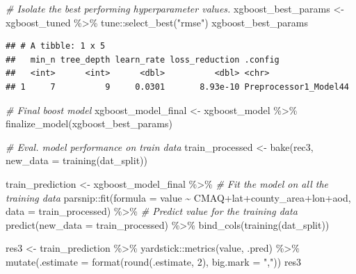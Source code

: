 \documentclass[
]{article}
\newenvironment{Shaded}{\begin{snugshade}}{\end{snugshade}}
\newcommand{\AttributeTok}[1]{\textcolor[rgb]{0.77,0.63,0.00}{#1}}
\newcommand{\CommentTok}[1]{\textcolor[rgb]{0.56,0.35,0.01}{\textit{#1}}}
\newcommand{\DecValTok}[1]{\textcolor[rgb]{0.00,0.00,0.81}{#1}}
\newcommand{\FunctionTok}[1]{\textcolor[rgb]{0.00,0.00,0.00}{#1}}
\newcommand{\NormalTok}[1]{#1}
\newcommand{\OtherTok}[1]{\textcolor[rgb]{0.56,0.35,0.01}{#1}}
\newcommand{\SpecialCharTok}[1]{\textcolor[rgb]{0.00,0.00,0.00}{#1}}
\newcommand{\StringTok}[1]{\textcolor[rgb]{0.31,0.60,0.02}{#1}}
\begin{document}
\begin{Shaded}
\begin{Highlighting}[]
\CommentTok{\# Isolate the best performing hyperparameter values.}
\NormalTok{xgboost\_best\_params }\OtherTok{\textless{}{-}}\NormalTok{ xgboost\_tuned }\SpecialCharTok{\%\textgreater{}\%}\NormalTok{ tune}\SpecialCharTok{::}\FunctionTok{select\_best}\NormalTok{(}\StringTok{"rmse"}\NormalTok{)}
\NormalTok{xgboost\_best\_params}
\end{Highlighting}
\end{Shaded}

\begin{verbatim}
## # A tibble: 1 x 5
##   min_n tree_depth learn_rate loss_reduction .config              
##   <int>      <int>      <dbl>          <dbl> <chr>                
## 1     7          9     0.0301       8.93e-10 Preprocessor1_Model44
\end{verbatim}

\begin{Shaded}
\begin{Highlighting}[]
\CommentTok{\# Final boost model}
\NormalTok{xgboost\_model\_final }\OtherTok{\textless{}{-}}\NormalTok{ xgboost\_model }\SpecialCharTok{\%\textgreater{}\%} \FunctionTok{finalize\_model}\NormalTok{(xgboost\_best\_params)}

\CommentTok{\# Eval. model performance on train data}
\NormalTok{train\_processed }\OtherTok{\textless{}{-}} \FunctionTok{bake}\NormalTok{(rec3,  }\AttributeTok{new\_data =} \FunctionTok{training}\NormalTok{(dat\_split))}

\NormalTok{train\_prediction }\OtherTok{\textless{}{-}}\NormalTok{ xgboost\_model\_final }\SpecialCharTok{\%\textgreater{}\%}
  \CommentTok{\# Fit the model on all the training data}
\NormalTok{  parsnip}\SpecialCharTok{::}\FunctionTok{fit}\NormalTok{(}\AttributeTok{formula =}\NormalTok{ value }\SpecialCharTok{\textasciitilde{}}\NormalTok{ CMAQ}\SpecialCharTok{+}\NormalTok{lat}\SpecialCharTok{+}\NormalTok{county\_area}\SpecialCharTok{+}\NormalTok{lon}\SpecialCharTok{+}\NormalTok{aod, }\AttributeTok{data =}\NormalTok{ train\_processed) }\SpecialCharTok{\%\textgreater{}\%}
  \CommentTok{\# Predict value for the training data}
  \FunctionTok{predict}\NormalTok{(}\AttributeTok{new\_data =}\NormalTok{ train\_processed) }\SpecialCharTok{\%\textgreater{}\%}
  \FunctionTok{bind\_cols}\NormalTok{(}\FunctionTok{training}\NormalTok{(dat\_split))}

\NormalTok{res3 }\OtherTok{\textless{}{-}}\NormalTok{ train\_prediction }\SpecialCharTok{\%\textgreater{}\%}
\NormalTok{  yardstick}\SpecialCharTok{::}\FunctionTok{metrics}\NormalTok{(value, .pred) }\SpecialCharTok{\%\textgreater{}\%}
  \FunctionTok{mutate}\NormalTok{(}\AttributeTok{.estimate =} \FunctionTok{format}\NormalTok{(}\FunctionTok{round}\NormalTok{(.estimate, }\DecValTok{2}\NormalTok{), }\AttributeTok{big.mark =} \StringTok{","}\NormalTok{))}
\NormalTok{res3}
\end{Highlighting}
\end{Shaded}
\end{document}
